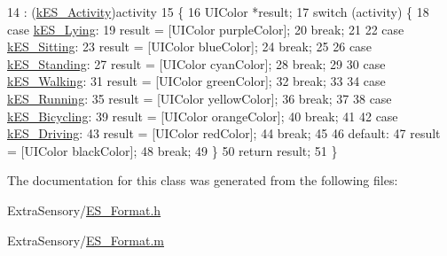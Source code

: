 \begin{DoxyCode}
14                              : (\hyperlink{_e_s___format_8h_add167ed0d3d9a3427ddd18f420f49db8}{kES\_Activity})activity
15 \{
16     UIColor *result;
17     \textcolor{keywordflow}{switch} (activity) \{
18         \textcolor{keywordflow}{case} \hyperlink{_e_s___format_8h_add167ed0d3d9a3427ddd18f420f49db8a27d9e6b2b54ca11495fb0a1b1d6d1be0}{kES\_Lying}:
19             result = [UIColor purpleColor];
20             \textcolor{keywordflow}{break};
21             
22         \textcolor{keywordflow}{case} \hyperlink{_e_s___format_8h_add167ed0d3d9a3427ddd18f420f49db8a1ef062083d68e64cd5bf0c19ca4054f3}{kES\_Sitting}:
23             result = [UIColor blueColor];
24             \textcolor{keywordflow}{break};
25             
26         \textcolor{keywordflow}{case} \hyperlink{_e_s___format_8h_add167ed0d3d9a3427ddd18f420f49db8aef6eb20d0735eaf43dc0e03b86464ce5}{kES\_Standing}:
27             result = [UIColor cyanColor];
28             \textcolor{keywordflow}{break};
29             
30         \textcolor{keywordflow}{case} \hyperlink{_e_s___format_8h_add167ed0d3d9a3427ddd18f420f49db8a37550925ffc43da32fe1a273538f10ff}{kES\_Walking}:
31             result = [UIColor greenColor];
32             \textcolor{keywordflow}{break};
33             
34         \textcolor{keywordflow}{case} \hyperlink{_e_s___format_8h_add167ed0d3d9a3427ddd18f420f49db8a912ba29855ae922dddb4e786e11e595d}{kES\_Running}:
35             result = [UIColor yellowColor];
36             \textcolor{keywordflow}{break};
37             
38         \textcolor{keywordflow}{case} \hyperlink{_e_s___format_8h_add167ed0d3d9a3427ddd18f420f49db8acba518781f9fc2b4666b42fe3cee452f}{kES\_Bicycling}:
39             result = [UIColor orangeColor];
40             \textcolor{keywordflow}{break};
41             
42         \textcolor{keywordflow}{case} \hyperlink{_e_s___format_8h_add167ed0d3d9a3427ddd18f420f49db8a1335f91d3416112fd613ac9137bd6961}{kES\_Driving}:
43             result = [UIColor redColor];
44             \textcolor{keywordflow}{break};
45             
46         \textcolor{keywordflow}{default}:
47             result = [UIColor blackColor];
48             \textcolor{keywordflow}{break};
49     \}
50     \textcolor{keywordflow}{return} result;
51 \}
\end{DoxyCode}


The documentation for this class was generated from the following files\+:\begin{DoxyCompactItemize}
\item 
Extra\+Sensory/\hyperlink{_e_s___format_8h}{E\+S\+\_\+\+Format.\+h}\item 
Extra\+Sensory/\hyperlink{_e_s___format_8m}{E\+S\+\_\+\+Format.\+m}\end{DoxyCompactItemize}
